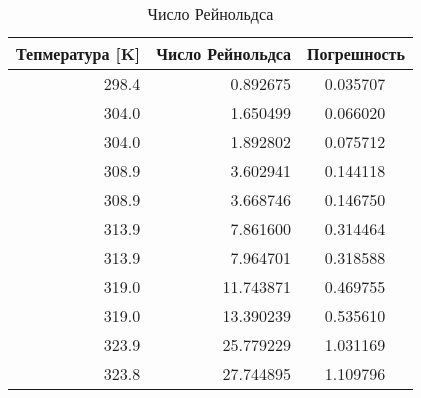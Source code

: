 \begin{table}
\centering
\caption{Число Рейнольдса}
\begin{tabular}{rrrl}
\toprule
 Тепмература [K] &  Число Рейнольдса & \multicolumn{2}{l}{Погрешность} \\
\midrule
           298.4 &          0.892675 &     0.035707 &          \\
           304.0 &          1.650499 &     0.066020 &          \\
           304.0 &          1.892802 &     0.075712 &          \\
           308.9 &          3.602941 &     0.144118 &          \\
           308.9 &          3.668746 &     0.146750 &          \\
           313.9 &          7.861600 &     0.314464 &          \\
           313.9 &          7.964701 &     0.318588 &          \\
           319.0 &         11.743871 &     0.469755 &          \\
           319.0 &         13.390239 &     0.535610 &          \\
           323.9 &         25.779229 &     1.031169 &          \\
           323.8 &         27.744895 &     1.109796 &          \\
\bottomrule
\end{tabular}
\end{table}
